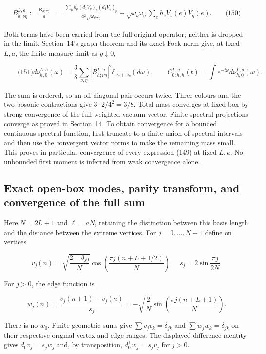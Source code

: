 \[
\begin{aligned}
 B_{h;\nu\eta}^{L,a}:=\frac{\mathsf R_{h;\nu\eta}}{a}
 &= \frac{\sum_p h_p(d_1V_\nu)_p(d_1V_\eta)_p}
                  {a^2\sqrt{\omega_\nu\omega_\eta}}
       -\sqrt{\omega_\nu\omega_\eta}\sum_e h_e V_\nu(e)V_\eta(e).
 \qquad\text{(150)}
\end{aligned}
\]

Both terms have been carried from the full original operator; neither is
dropped in the limit. Section~14's graph theorem and its exact Fock norm
give, at fixed \(L,a\), the finite-measure limit as \(g\downarrow0\),

\[
\qquad\text{(151)}
 d\nu_{h,0}^{L,a}(\omega)
 =\frac38\sum_{\nu,\eta}|B_{h;\nu\eta}^{L,a}|^2
                 \delta_{\omega_\nu+\omega_\eta}(d\omega),
 \qquad C_{0;h,h}^{L,a}(t)=\int e^{-t\omega}d\nu_{h,0}^{L,a}(\omega).
\]

The sum is ordered, so an off-diagonal pair occurs twice. Three colours
and the two bosonic contractions give \(3\cdot2/4^2=3/8\). Total mass
converges at fixed box by strong convergence of the full weighted vacuum
vector. Finite spectral projections converge as proved in Section~14. To
obtain convergence for a bounded continuous spectral function, first
truncate to a finite union of spectral intervals and then use the
convergent vector norms to make the remaining mass small. This proves in
particular convergence of every expression (149) at fixed \(L,a\). No
unbounded first moment is inferred from weak convergence alone.

\subsection{Exact open-box modes, parity transform, and convergence of
the full
sum}\label{full-local-spectrum-md-exact-open-box-modes-parity-transform-and-convergence-of-the-full-sum}

Here \(N=2L+1\) and \(\ell=aN\), retaining the distinction between this
basis length and the distance between the extreme vertices. For
\(j=0,\ldots,N-1\) define on vertices

\[
v_j(n)=\sqrt{\frac{2-\delta_{j0}}N}
       \cos\!\left(\frac{\pi j(n+L+1/2)}N\right),
 \quad s_j=2\sin\frac{\pi j}{2N}.
\]

For \(j>0\), the edge function is

\[
w_j(n)=\frac{v_j(n+1)-v_j(n)}{s_j}
       =-\sqrt{\frac2N}\sin\!\left(\frac{\pi j(n+L+1)}N\right).
\]

There is no \(w_0\). Finite geometric sums give
\(\sum v_jv_k=\delta_{jk}\) and \(\sum w_jw_k=\delta_{jk}\) on their
respective original vertex and edge ranges. The displayed difference
identity gives \(d_0v_j=s_jw_j\) and, by transposition,
\(d_0^{\mathsf T}w_j=s_jv_j\) for \(j>0\).

